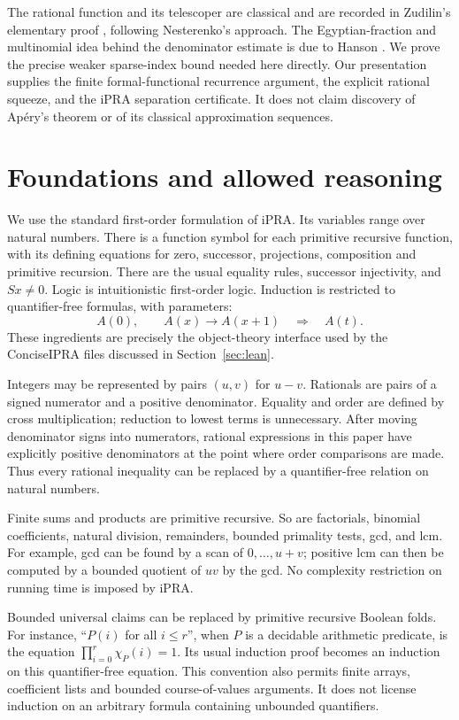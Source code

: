 \documentclass[11pt]{article}
\theoremstyle{definition}\newtheorem{definition}[theorem]{Definition}
\theoremstyle{remark}\newtheorem{remark}[theorem]{Remark}
\begin{document}
The rational function and its telescoper are classical and are recorded in
Zudilin's elementary proof \cite{Zudilin}, following Nesterenko's approach.
The Egyptian-fraction and multinomial idea behind the denominator estimate
is due to Hanson \cite{Hanson}. We prove the precise weaker sparse-index bound
needed here directly. Our presentation supplies the finite formal-functional
recurrence argument, the explicit rational squeeze, and the iPRA separation
certificate. It does not claim discovery of Ap\'ery's theorem or of its
classical approximation sequences.

\section{Foundations and allowed reasoning}\label{sec:foundations}
We use the standard first-order formulation of iPRA. Its variables range over
natural numbers. There is a function symbol for each primitive recursive
function, with its defining equations for zero, successor, projections,
composition and primitive recursion. There are the usual equality rules,
successor injectivity, and $Sx\ne0$. Logic is intuitionistic first-order logic.
Induction is restricted to quantifier-free formulas, with parameters:
\[
 A(0),\qquad A(x)\longrightarrow A(x+1)
 \quad\Longrightarrow\quad A(t).
\]
These ingredients are precisely the object-theory interface used by the
ConciseIPRA files discussed in Section~\ref{sec:lean}.

Integers may be represented by pairs $(u,v)$ for $u-v$. Rationals are pairs
of a signed numerator and a positive denominator. Equality and order are
defined by cross multiplication; reduction to lowest terms is unnecessary.
After moving denominator signs into numerators, rational expressions in
this paper have explicitly positive denominators at the point where order
comparisons are made. Thus every rational inequality
can be replaced by a quantifier-free relation on natural numbers.

Finite sums and products are primitive recursive. So are factorials,
binomial coefficients, natural division, remainders, bounded primality tests,
gcd, and lcm. For example, gcd can be found by a scan of $0,\ldots,u+v$;
positive lcm can then be computed by a bounded quotient of $uv$ by the gcd.
No complexity restriction on running time is imposed by iPRA.

Bounded universal claims can be replaced by primitive recursive Boolean
folds. For instance, ``$P(i)$ for all $i\le r$'', when $P$ is a decidable
arithmetic predicate, is the equation
$\prod_{i=0}^{r}\chi_P(i)=1$. Its usual induction proof becomes an induction
on this quantifier-free equation. This convention also permits finite
arrays, coefficient lists and bounded course-of-values arguments. It does
not license induction on an arbitrary formula containing unbounded
quantifiers.
\end{document}
